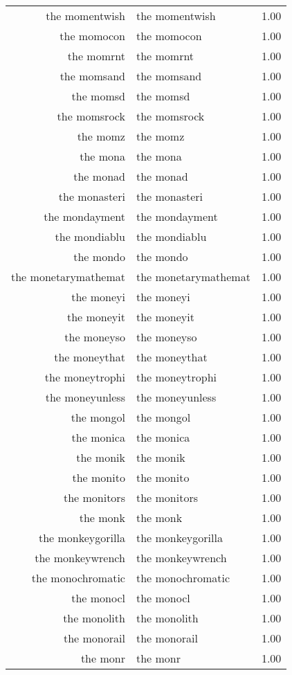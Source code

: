 \begin{table}[ht]
\begin{tabular}{rlr}
  the momentwish & the momentwish & 1.00 \\ 
  the momocon & the momocon & 1.00 \\ 
  the momrnt & the momrnt & 1.00 \\ 
  the momsand & the momsand & 1.00 \\ 
  the momsd & the momsd & 1.00 \\ 
  the momsrock & the momsrock & 1.00 \\ 
  the momz & the momz & 1.00 \\ 
  the mona & the mona & 1.00 \\ 
  the monad & the monad & 1.00 \\ 
  the monasteri & the monasteri & 1.00 \\ 
  the mondayment & the mondayment & 1.00 \\ 
  the mondiablu & the mondiablu & 1.00 \\ 
  the mondo & the mondo & 1.00 \\ 
  the monetarymathemat & the monetarymathemat & 1.00 \\ 
  the moneyi & the moneyi & 1.00 \\ 
  the moneyit & the moneyit & 1.00 \\ 
  the moneyso & the moneyso & 1.00 \\ 
  the moneythat & the moneythat & 1.00 \\ 
  the moneytrophi & the moneytrophi & 1.00 \\ 
  the moneyunless & the moneyunless & 1.00 \\ 
  the mongol & the mongol & 1.00 \\ 
  the monica & the monica & 1.00 \\ 
  the monik & the monik & 1.00 \\ 
  the monito & the monito & 1.00 \\ 
  the monitors & the monitors & 1.00 \\ 
  the monk & the monk & 1.00 \\ 
  the monkeygorilla & the monkeygorilla & 1.00 \\ 
  the monkeywrench & the monkeywrench & 1.00 \\ 
  the monochromatic & the monochromatic & 1.00 \\ 
  the monocl & the monocl & 1.00 \\ 
  the monolith & the monolith & 1.00 \\ 
  the monorail & the monorail & 1.00 \\ 
  the monr & the monr & 1.00 \\ 

\end{tabular}
\end{table}
